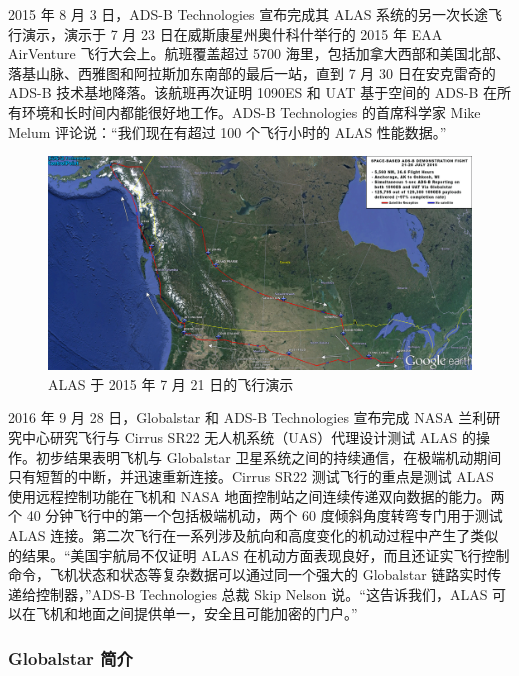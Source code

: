 2015 年 8 月 3 日，ADS-B Technologies 宣布完成其 ALAS 系统的另一次长途飞行演示，演示于 7 月 23 日在威斯康星州奥什科什举行的 2015 年 EAA AirVenture 飞行大会上。航班覆盖超过 5700 海里，包括加拿大西部和美国北部、落基山脉、西雅图和阿拉斯加东南部的最后一站，直到 7 月 30 日在安克雷奇的 ADS-B 技术基地降落。该航班再次证明 1090ES 和 UAT 基于空间的 ADS-B 在所有环境和长时间内都能很好地工作。ADS-B Technologies 的首席科学家 Mike Melum 评论说：“我们现在有超过 100 个飞行小时的 ALAS 性能数据。”

\begin{figure}[!htb]
\centering
\includegraphics[width=14.5cm]{pic/Flight-Demo-21-July-15b.png}
\caption{ALAS 于 2015 年 7 月 21 日的飞行演示\protect\footnotemark}
\label{fig:Flight-Demo-21-July-15b}
\end{figure}


2016 年 9 月 28 日，Globalstar 和 ADS-B Technologies 宣布完成 NASA 兰利研究中心研究飞行与 Cirrus SR22 无人机系统（UAS）代理设计测试 ALAS 的操作。初步结果表明飞机与 Globalstar 卫星系统之间的持续通信，在极端机动期间只有短暂的中断，并迅速重新连接。Cirrus SR22 测试飞行的重点是测试 ALAS 使用远程控制功能在飞机和 NASA 地面控制站之间连续传递双向数据的能力。两个 40 分钟飞行中的第一个包括极端机动，两个 60 度倾斜角度转弯专门用于测试 ALAS 连接。第二次飞行在一系列涉及航向和高度变化的机动过程中产生了类似的结果。“美国宇航局不仅证明 ALAS 在机动方面表现良好，而且还证实飞行控制命令，飞机状态和状态等复杂数据可以通过同一个强大的 Globalstar 链路实时传递给控制器​​，”ADS-B Technologies 总裁 Skip Nelson 说。“这告诉我们，ALAS 可以在飞机和地面之间提供单一，安全且可能加密的门户。”

\subsubsection{Globalstar 简介}

